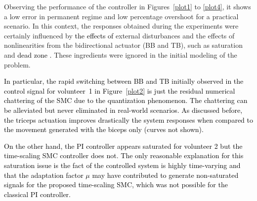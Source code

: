 \documentclass[review]{elsarticle}
\begin{document}
Observing the performance of the controller in Figures~\ref{plot1} to \ref{plot4}, it shows a low error in permanent regime and low percentage overshoot for a practical scenario. In this context, the responses obtained during the experiments were certainly influenced by
\textcolor{black}{the effects of} external disturbances and the effects of nonlinearities from the bidirectional actuator (BB and TB),
such as saturation and \textcolor{black}{dead zone \cite{SNPHFFR:2005}.} These ingredients were ignored in the initial modeling of the problem.

\newpage

\textcolor{black}{In particular, the rapid switching between BB and TB initially observed in the control signal for volunteer~1 in
Figure~\ref{plot2} is just the residual numerical chattering of the SMC due to the quantization phenomenon. The chattering can be alleviated but never eliminated in real-world scenarios. As discussed before, the triceps actuation improves drastically the system responses when compared to the movement generated with the biceps only (curves not shown).}


\textcolor{black}{On the other hand, the PI controller appears saturated for volunteer 2 but the time-scaling SMC controller does not.  The only reasonable explanation for this saturation issue is the fact of the controlled system is highly time-varying and that the adaptation factor
$\mu$ may have contributed to generate non-saturated signals for the proposed time-scaling SMC, which was not possible for the classical PI controller.}

\newpage
\end{document}
